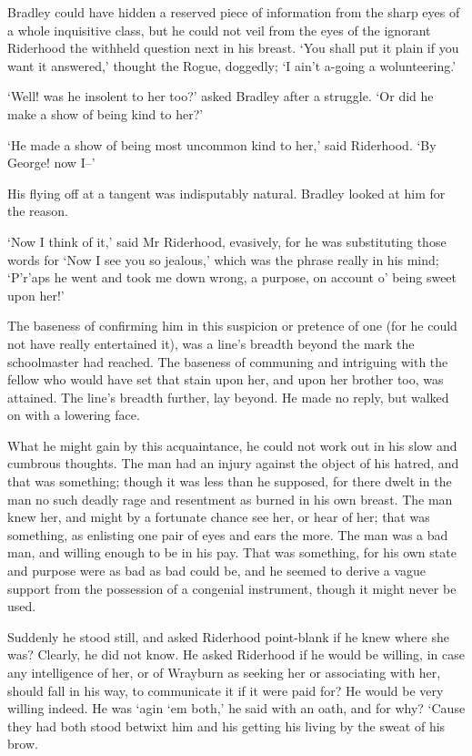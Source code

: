 Bradley could have hidden a reserved piece of information from the sharp
eyes of a whole inquisitive class, but he could not veil from the eyes
of the ignorant Riderhood the withheld question next in his breast.
‘You shall put it plain if you want it answered,’ thought the Rogue,
doggedly; ‘I ain’t a-going a wolunteering.’

‘Well! was he insolent to her too?’ asked Bradley after a struggle. ‘Or
did he make a show of being kind to her?’

‘He made a show of being most uncommon kind to her,’ said Riderhood. ‘By
George! now I--’

His flying off at a tangent was indisputably natural. Bradley looked at
him for the reason.

‘Now I think of it,’ said Mr Riderhood, evasively, for he was
substituting those words for ‘Now I see you so jealous,’ which was the
phrase really in his mind; ‘P’r’aps he went and took me down wrong, a
purpose, on account o’ being sweet upon her!’

The baseness of confirming him in this suspicion or pretence of one (for
he could not have really entertained it), was a line’s breadth beyond
the mark the schoolmaster had reached. The baseness of communing and
intriguing with the fellow who would have set that stain upon her, and
upon her brother too, was attained. The line’s breadth further, lay
beyond. He made no reply, but walked on with a lowering face.

What he might gain by this acquaintance, he could not work out in his
slow and cumbrous thoughts. The man had an injury against the object of
his hatred, and that was something; though it was less than he supposed,
for there dwelt in the man no such deadly rage and resentment as burned
in his own breast. The man knew her, and might by a fortunate chance see
her, or hear of her; that was something, as enlisting one pair of eyes
and ears the more. The man was a bad man, and willing enough to be in
his pay. That was something, for his own state and purpose were as
bad as bad could be, and he seemed to derive a vague support from the
possession of a congenial instrument, though it might never be used.

Suddenly he stood still, and asked Riderhood point-blank if he knew
where she was? Clearly, he did not know. He asked Riderhood if he would
be willing, in case any intelligence of her, or of Wrayburn as seeking
her or associating with her, should fall in his way, to communicate it
if it were paid for? He would be very willing indeed. He was ‘agin ‘em
both,’ he said with an oath, and for why? ‘Cause they had both stood
betwixt him and his getting his living by the sweat of his brow.

